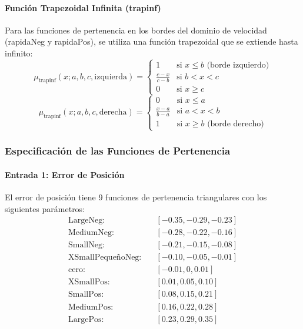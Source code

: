 \documentclass[
A4paper,            1 paper size A4
oneside,            %
openright,          %
10pt,               %
headings=normal,    %
titlepage=on        %
]{article}
\begin{document}
\paragraph{Función Trapezoidal Infinita (trapinf)}
Para las funciones de pertenencia en los bordes del dominio de velocidad (rapidaNeg y rapidaPos), se utiliza una función trapezoidal que se extiende hasta infinito:
\begin{equation}
    \mu_{\text{trapinf}}(x; a, b, c, \text{izquierda}) = \begin{cases}
        1 & \text{si } x \leq b \text{ (borde izquierdo)} \\
        \frac{c-x}{c-b} & \text{si } b < x < c \\
        0 & \text{si } x \geq c
    \end{cases}
\end{equation}
\begin{equation}
    \mu_{\text{trapinf}}(x; a, b, c, \text{derecha}) = \begin{cases}
        0 & \text{si } x \leq a \\
        \frac{x-a}{b-a} & \text{si } a < x < b \\
        1 & \text{si } x \geq b \text{ (borde derecho)}
    \end{cases}
\end{equation}

\subsubsection{Especificación de las Funciones de Pertenencia}

\paragraph{Entrada 1: Error de Posición}
El error de posición tiene 9 funciones de pertenencia triangulares con los siguientes parámetros:
\begin{align}
    \text{LargeNeg:} &\quad [-0.35, -0.29, -0.23] \\
    \text{MediumNeg:} &\quad [-0.28, -0.22, -0.16] \\
    \text{SmallNeg:} &\quad [-0.21, -0.15, -0.08] \\
    \text{XSmallPequeñoNeg:} &\quad [-0.10, -0.05, -0.01] \\
    \text{cero:} &\quad [-0.01, 0, 0.01] \\
    \text{XSmallPos:} &\quad [0.01, 0.05, 0.10] \\
    \text{SmallPos:} &\quad [0.08, 0.15, 0.21] \\
    \text{MediumPos:} &\quad [0.16, 0.22, 0.28] \\
    \text{LargePos:} &\quad [0.23, 0.29, 0.35]
\end{align}
\end{document}
